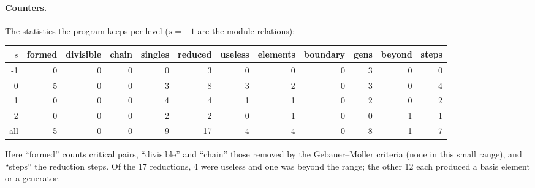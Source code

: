 \documentclass[11pt]{article}
\begin{document}
\paragraph{Counters.}
The statistics the program keeps per level ($s = -1$ are the module relations):
\begin{center}
\footnotesize\setlength{\tabcolsep}{3.5pt}
\begin{tabular}{rrrrrrrrrrrr}
\toprule
$s$ & formed & divisible & chain & singles & reduced & useless & elements & boundary & gens & beyond & steps \\
\midrule
-1 & 0 & 0 & 0 & 0 & 3 & 0 & 0 & 0 & 3 & 0 & 0 \\
0 & 5 & 0 & 0 & 3 & 8 & 3 & 2 & 0 & 3 & 0 & 4 \\
1 & 0 & 0 & 0 & 4 & 4 & 1 & 1 & 0 & 2 & 0 & 2 \\
2 & 0 & 0 & 0 & 2 & 2 & 0 & 1 & 0 & 0 & 1 & 1 \\
all & 5 & 0 & 0 & 9 & 17 & 4 & 4 & 0 & 8 & 1 & 7 \\
\bottomrule
\end{tabular}
\end{center}
Here ``formed'' counts critical pairs, ``divisible'' and ``chain'' those removed by the
Gebauer--Möller criteria (none in this small range), and ``steps'' the reduction steps. Of the
17 reductions, 4 were useless and one was beyond the range; the other 12 each produced a basis
element or a generator.
\end{document}
